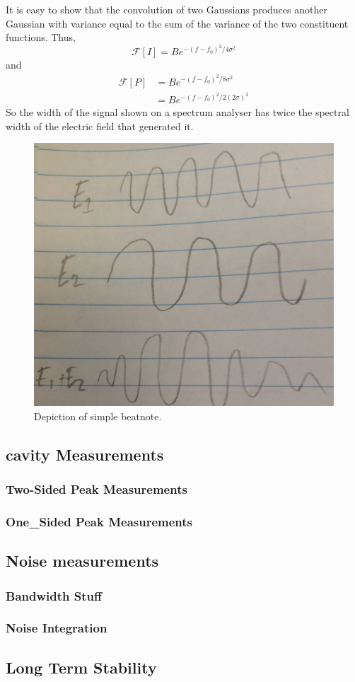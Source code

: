 It is easy to show that the convolution of two Gaussians produces another Gaussian with variance equal to the sum of the variance of the two constituent functions.
Thus,
\begin{equation}
\mathcal{F}[I] = B e^{-(f-f_0)^2/4\sigma^2}
\end{equation}
and
\begin{align}
\mathcal{F}[P] &= B e^{-(f-f_0)^2/8\sigma^2}\nonumber\\
&= B e^{-(f-f_0)^2/2(2\sigma)^2}
\end{align}
So the width of the signal shown on a spectrum analyser has twice the spectral width of the electric field that generated it.

\begin{figure}
\centering
\includegraphics[width=0.5\linewidth]{part1/Figs/beatnote.jpg}
\caption{Depiction of simple beatnote.}
\label{figure:simple_beatnote}
\end{figure}


\subsection{cavity Measurements}

\subsubsection{Two-Sided Peak Measurements}

\subsubsection{One_Sided Peak Measurements}

\subsection{Noise measurements}

\subsubsection{Bandwidth Stuff}

\subsubsection{Noise Integration}

\subsection{Long Term Stability}

